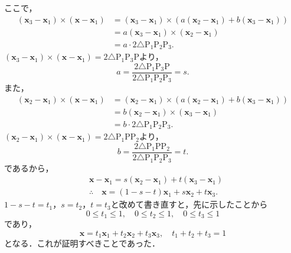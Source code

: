 \begin{tproof}
  ここで，
  \begin{align*}
    (\bm{x}_3 - \bm{x}_1) \times (\bm{x}-\bm{x}_1) & =  (\bm{x}_3 - \bm{x}_1) \times (a(\bm{x}_2 - \bm{x}_1) + b(\bm{x}_3 - \bm{x}_1)) \\
                                                   & = a (\bm{x}_3- \bm{x}_1) \times (\bm{x}_2 - \bm{x}_1)                             \\
                                                   & = a \cdot 2 \triangle \mathrm{P}_1 \mathrm{P}_2 \mathrm{P}_3.
  \end{align*}
  $(\bm{x}_3 - \bm{x}_1) \times (\bm{x}-\bm{x}_1) = 2 \triangle \mathrm{P}_1 \mathrm{P}_3 \mathrm{P}$より，
  \[
    a = \frac{2 \triangle \mathrm{P}_1 \mathrm{P}_3 \mathrm{P}} {2 \triangle \mathrm{P}_1 \mathrm{P}_2 \mathrm{P}_3}= s.
  \]
  また，
  \begin{align*}
    (\bm{x}_2 - \bm{x}_1) \times (\bm{x}-\bm{x}_1) & =  (\bm{x}_2 - \bm{x}_1) \times (a(\bm{x}_2 - \bm{x}_1) + b(\bm{x}_3 - \bm{x}_1)) \\
                                                   & = b (\bm{x}_2- \bm{x}_1) \times (\bm{x}_3 - \bm{x}_1)                             \\
                                                   & = b \cdot 2 \triangle \mathrm{P}_1 \mathrm{P}_2 \mathrm{P}_3.
  \end{align*}
  $(\bm{x}_2 - \bm{x}_1) \times (\bm{x}-\bm{x}_1) = 2 \triangle \mathrm{P}_1 \mathrm{P} \mathrm{P}_2$より，
  \[
    b = \frac{2 \triangle \mathrm{P}_1 \mathrm{P} \mathrm{P}_2} {2 \triangle \mathrm{P}_1 \mathrm{P}_2 \mathrm{P}_3}=t.
  \]
  であるから，
  \begin{align*}
     & \bm{x} - \bm{x}_1 = s(\bm{x}_2 - \bm{x}_1) + t(\bm{x}_3 - \bm{x}_1) \\
     & \therefore \quad \bm{x} = (1-s-t)\bm{x}_1 + s\bm{x}_2 + t\bm{x}_3.
  \end{align*}
  $1-s-t=t_1 $，$s=t_2$，$t=t_3$と改めて書き直すと，先に示したことから
  \[
    0 \le t_1 \le 1 ,\quad 0 \le t_2 \le 1 ,\quad 0 \le t_3 \le 1
  \]
  であり，
  \[
    \bm{x} = t_1\bm{x}_1 + t_2\bm{x}_2 + t_3 \bm{x}_3,\quad t_1+t_2+t_3=1
  \]
  となる．これが証明すべきことであった．
\end{tproof}
%

%
